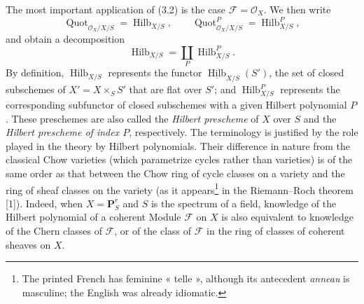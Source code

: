 The most important application of (3.2) is the case
$\mathcal F=\mathcal O_X$. We then write
\[
\operatorname{Quot}_{\mathcal O_X/X/S}=\operatorname{Hilb}_{X/S},
\qquad
\operatorname{Quot}^P_{\mathcal O_X/X/S}=\operatorname{Hilb}^P_{X/S},
\]
and obtain a decomposition
\[
\operatorname{Hilb}_{X/S}=\coprod_P\operatorname{Hilb}^P_{X/S}.
\]
By definition, $\operatorname{Hilb}_{X/S}$ represents the functor
$\underline{\operatorname{Hilb}}_{X/S}(S')$, the set of closed subschemes of
$X'=X\times_SS'$ that are flat over $S'$; and
$\operatorname{Hilb}^P_{X/S}$ represents the corresponding subfunctor of
closed subschemes with a given Hilbert polynomial $P$. These preschemes are
also called the \emph{Hilbert prescheme} of $X$ over $S$ and the
\emph{Hilbert prescheme of index $P$}, respectively. The terminology is
justified by the role played in the theory by Hilbert polynomials. Their
difference in nature from the classical Chow varieties (which parametrize
cycles rather than varieties) is of the same order as that between
the Chow ring of cycle classes on a variety and the ring of sheaf classes on
the variety (as it appears\footnote{The printed French has feminine « telle », although its antecedent \emph{anneau} is masculine; the English was already idiomatic.} in the Riemann--Roch theorem [1]). Indeed, when
$X=\mathbf P^r_S$ and $S$ is the spectrum of a field, knowledge of the Hilbert
polynomial of a coherent Module $\mathcal F$ on $X$ is also equivalent to
knowledge of the Chern classes of $\mathcal F$, or of the class of $\mathcal F$
in the ring of classes of coherent sheaves on $X$.

